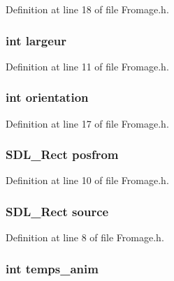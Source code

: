 Definition at line 18 of file Fromage.\-h.

\hypertarget{struct_fromage_a74f0f2591e5f65bf792b2c3c67817d78}{
\subsubsection[{largeur}]{\setlength{\rightskip}{0pt plus 5cm}int largeur}}\label{struct_fromage_a74f0f2591e5f65bf792b2c3c67817d78}


Definition at line 11 of file Fromage.\-h.

\hypertarget{struct_fromage_a528d22a2a1651a4831eb643884a3c718}{
\subsubsection[{orientation}]{\setlength{\rightskip}{0pt plus 5cm}int orientation}}\label{struct_fromage_a528d22a2a1651a4831eb643884a3c718}


Definition at line 17 of file Fromage.\-h.

\hypertarget{struct_fromage_a0fcd2fb6981b924459a467441bf99419}{
\subsubsection[{posfrom}]{\setlength{\rightskip}{0pt plus 5cm}S\-D\-L\-\_\-\-Rect posfrom}}\label{struct_fromage_a0fcd2fb6981b924459a467441bf99419}


Definition at line 10 of file Fromage.\-h.

\hypertarget{struct_fromage_a4b36eb370ba51290847183a8da37db31}{
\subsubsection[{source}]{\setlength{\rightskip}{0pt plus 5cm}S\-D\-L\-\_\-\-Rect source}}\label{struct_fromage_a4b36eb370ba51290847183a8da37db31}


Definition at line 8 of file Fromage.\-h.

\hypertarget{struct_fromage_a9f94aff026d82b8ba1067a997eb23102}{
\subsubsection[{temps\-\_\-anim}]{\setlength{\rightskip}{0pt plus 5cm}int temps\-\_\-anim}}\label{struct_fromage_a9f94aff026d82b8ba1067a997eb23102}


